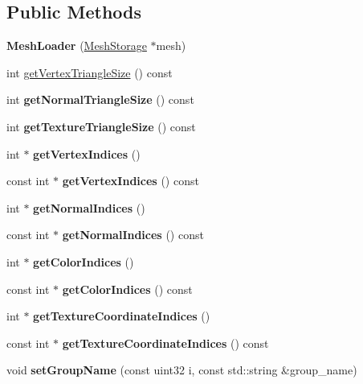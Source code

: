 \subsection*{Public Methods}
\begin{DoxyCompactItemize}
\item 
\mbox{\label{class_mesh_loader_ad2479b75e00ebecb8a4e3954eb1673aa}} 
{\bfseries Mesh\+Loader} (\hyperlink{class_mesh_storage}{Mesh\+Storage} $\ast$mesh)
\item 
int \hyperlink{class_mesh_loader_a3e228f5e2fbb1261cd76871ee07e4f58}{get\+Vertex\+Triangle\+Size} () const
\item 
\mbox{\label{class_mesh_loader_ab09fa780b990617917aabfcf3aa0fc25}} 
int {\bfseries get\+Normal\+Triangle\+Size} () const
\item 
\mbox{\label{class_mesh_loader_a6692b77e125599e802307a7ec265724c}} 
int {\bfseries get\+Texture\+Triangle\+Size} () const
\item 
\mbox{\label{class_mesh_loader_aadcdc2263c72eb06febe0f53666601dc}} 
int $\ast$ {\bfseries get\+Vertex\+Indices} ()
\item 
\mbox{\label{class_mesh_loader_aa511e240655b63fbb375a10db79d1a2a}} 
const int $\ast$ {\bfseries get\+Vertex\+Indices} () const
\item 
\mbox{\label{class_mesh_loader_ac634529b630cb2af557a91be234bebe4}} 
int $\ast$ {\bfseries get\+Normal\+Indices} ()
\item 
\mbox{\label{class_mesh_loader_af3c9decc51f14a7cc1029d27a10bbce4}} 
const int $\ast$ {\bfseries get\+Normal\+Indices} () const
\item 
\mbox{\label{class_mesh_loader_ab5fd2fe3eaf2cddb4f21470712553456}} 
int $\ast$ {\bfseries get\+Color\+Indices} ()
\item 
\mbox{\label{class_mesh_loader_a524488590c3fd1d29c8bf3ad5b26545d}} 
const int $\ast$ {\bfseries get\+Color\+Indices} () const
\item 
\mbox{\label{class_mesh_loader_aa5b401f352733edc86e564cb799ced8f}} 
int $\ast$ {\bfseries get\+Texture\+Coordinate\+Indices} ()
\item 
\mbox{\label{class_mesh_loader_af5a9b7daa098c2adf6894c2197c7778b}} 
const int $\ast$ {\bfseries get\+Texture\+Coordinate\+Indices} () const
\item 
\mbox{\label{class_mesh_loader_af1d9d097876866af05a5ff7909250842}} 
void {\bfseries set\+Group\+Name} (const uint32 i, const std\+::string \&group\+\_\+name)
\end{DoxyCompactItemize}
